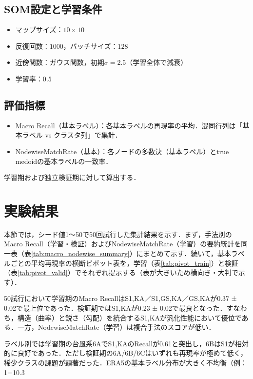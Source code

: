\documentclass{jarticle}
\theoremstyle{definition}
\begin{document}
\subsection{SOM設定と学習条件}
\begin{itemize}
\item マップサイズ：$10\times 10$
\item 反復回数：$1000$，バッチサイズ：$128$
\item 近傍関数：ガウス関数，初期$\sigma=2.5$（学習全体で減衰）
\item 学習率：$0.5$
\end{itemize}

\subsection{評価指標}
\begin{itemize}
\item Macro Recall（基本ラベル）：各基本ラベルの再現率の平均．混同行列は「基本ラベル vs クラスタ列」で集計．
\item NodewiseMatchRate（基本）：各ノードの多数決（基本ラベル）とtrue medoidの基本ラベルの一致率．
\end{itemize}
学習期および独立検証期に対して算出する．

\section{実験結果}
本節では，シード値1〜50で50回試行した集計結果を示す．まず，手法別のMacro Recall（学習・検証）およびNodewiseMatchRate（学習）の要約統計を同一表（表\ref{tab:macro_nodewise_summary}）にまとめて示す．続いて，基本ラベルごとの平均再現率の横断ピボット表を，学習（表\ref{tab:pivot_train}）と検証（表\ref{tab:pivot_valid}）でそれぞれ提示する（表が大きいため横向き・大判で示す）．

50試行において学習期のMacro RecallはS1,KA／S1,GS,KA／GS,KAが0.37 ± 0.02で最上位であった．検証期ではS1,KAが0.23 ± 0.02で最良となった．すなわち，構造（曲率）と鋭さ（勾配）を統合するS1,KAが汎化性能において優位である．一方，NodewiseMatchRate（学習）は複合手法のスコアが低い．

ラベル別では学習期の台風系6AでS1,KAのRecallが0.61と突出し，6BはS1が相対的に良好であった．ただし検証期の6A/6B/6Cはいずれも再現率が極めて低く，稀少クラスの課題が顕著だった．ERA5の基本ラベル分布が大きく不均衡（例：1=10.3%
\end{document}
